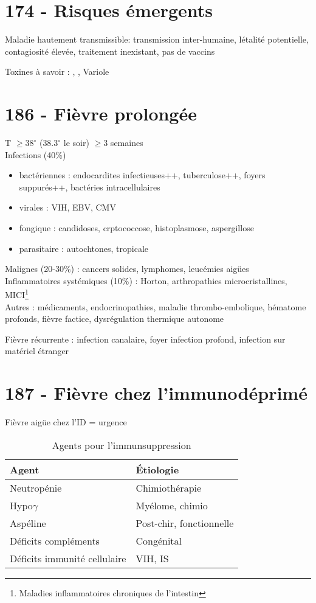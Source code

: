 \section{174 - Risques émergents}%
\label{sec:item_174_risques_emergents}

Maladie hautement transmissible: transmission inter-humaine, létalité
potentielle, contagiosité élevée, traitement inexistant, pas de vaccins

Toxines à savoir : , , Variole

\section{186 - Fièvre prolongée}
\label{sec:org0f8d15e}
T \(\ge 38^{\circ}\) (\(38.3^{\circ}\) le soir) \(\ge 3\) semaines\\
Infections (40\%)
\begin{itemize}
\item bactériennes : endocardites infectieuses++, tuberculose++, foyers suppurés++, bactéries intracellulaires
\item virales : VIH, EBV, CMV
\item fongique : candidoses, crptococcose, histoplasmose, aspergillose
\item parasitaire : autochtones, tropicale
\end{itemize}
Malignes (20-30\%) : cancers solides, lymphomes, leucémies aigües\\
Inflammatoires systémiques (10\%) : Horton, arthropathies microcristallines,
MICI\footnote{Maladies inflammatoires chroniques de l'intestin}\\
Autres : médicaments, endocrinopathies, maladie thrombo-embolique, hématome profonds, fièvre factice, dysrégulation thermique autonome

Fièvre récurrente : infection canalaire, foyer infection profond, infection sur matériel étranger

\section{187 - Fièvre chez l'immunodéprimé}
\label{sec:org3e1654b}
Fièvre aigüe chez l'ID = urgence 

\begin{table}[htbp]
\caption{Agents pour l'immunsuppression}
\centering
\begin{tabular}{ll}
Agent & Étiologie\\
\hline
Neutropénie & Chimiothérapie\\
Hypo\(\gamma\) & Myélome, chimio\\
Aspéline & Post-chir, fonctionnelle\\
Déficits compléments & Congénital\\
Déficits immunité cellulaire & VIH, IS\\
\end{tabular}
\end{table}
